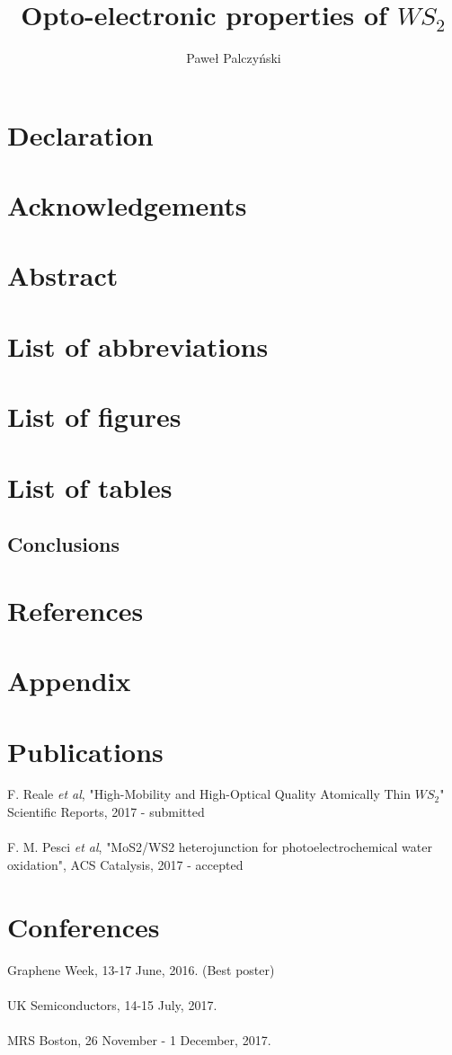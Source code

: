 \documentclass[12pt]{article}
\author{Paweł Palczyński}
\begin{document}
\tableofcontents

\title{Opto-electronic properties of $WS_2$}

\maketitle

\section*{Declaration}
\section*{Acknowledgements}
\section*{Abstract}
\section*{List of abbreviations}
\section*{List of figures}
\section*{List of tables}


\label{sec:Introduction}



\subsection{Conclusions}
	
\section*{References}
\section*{Appendix}

\section*{Publications}

F. Reale \textit{et al}, "High-Mobility and High-Optical Quality Atomically Thin $WS_2$" Scientific Reports, 2017 - submitted\\ \\
F. M. Pesci \textit{et al}, "MoS2/WS2 heterojunction for photoelectrochemical water oxidation", ACS Catalysis, 2017 - accepted

\section*{Conferences}

Graphene Week, 13-17 June, 2016. (Best poster)\\ \\
UK Semiconductors, 14-15 July, 2017.\\ \\
MRS Boston, 26 November - 1 December, 2017.


{}
\end{document}
